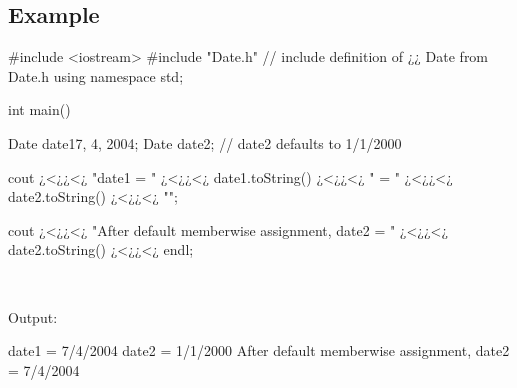 \newpage
\subsection{Example}
\begin{minipage}{\MPWxLARGExLISTING\textwidth} %
{} %
\begin{CPPCode}
#include <iostream>
#include "Date.h" // include definition of ¿¿ Date from Date.h
using namespace std;

int main()
{
    Date date1{7, 4, 2004};
    Date date2; // date2 defaults to 1/1/2000
    
    cout ¿<¿¿<¿ "date1 = " ¿<¿¿<¿ date1.toString() ¿<¿¿<¿ " = " ¿<¿¿<¿ date2.toString() ¿<¿¿<¿ "\n\n";
    
    cout ¿<¿¿<¿ "After default memberwise assignment, date2 = " ¿<¿¿<¿ date2.toString() ¿<¿¿<¿ endl;
}
\end{CPPCode}
\end{minipage}\\

\noindent{}
\begin{minipage}{\MPWxLARGExLISTING\textwidth} %
{} %
Output:\\
\vspace{-0.5cm}
\begin{Terminal}
date1 = 7/4/2004
date2 = 1/1/2000
After default memberwise assignment, date2 = 7/4/2004
\end{Terminal}
\end{minipage}